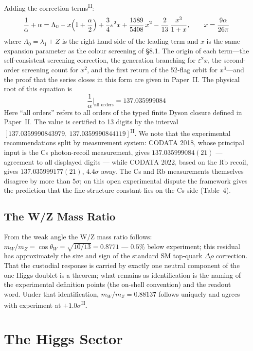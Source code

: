 \documentclass[12pt,a4paper]{article}
\newcommand{\PII}{\textsuperscript{\textup{II}}}
\begin{document}
Adding the correction terms\PII{}:
\[\frac{1}{\alpha} + \alpha = \Lambda_0 - x\Bigl(1+\frac{\alpha}{2}\Bigr) + \frac{3}{4}\varepsilon^2 x + \frac{1589}{5408}\,x^2 - \frac{2}{13}\,\frac{x^3}{1+x},\qquad x = \frac{9\alpha}{26\pi}\]
where $\Lambda_0 = \lambda_1 + Z$ is the right-hand side of the leading term and $x$ is the same expansion parameter as the colour screening of \S8.1. The origin of each term---the self-consistent screening correction, the generation branching for $\varepsilon^2 x$, the second-order screening count for $x^2$, and the first return of the 52-flag orbit for $x^3$---and the proof that the series closes in this form are given in Paper~II. The physical root of this equation is
\[\frac{1}{\alpha}\Big|_{\text{all orders}} = 137.035999084\]
Here ``all orders'' refers to all orders of the typed finite Dyson closure defined in Paper~II. The value is certified to 13 digits by the interval $[137.0359990843979,\ 137.0359990844119]$\PII{}. We note that the experimental recommendations split by measurement system: CODATA 2018, whose principal input is the Cs photon-recoil measurement, gives $137.035999084(21)$ --- agreement to all displayed digits --- while CODATA 2022, based on the Rb recoil, gives $137.035999177(21)$, $4.4\sigma$ away. The Cs and Rb measurements themselves disagree by more than $5\sigma$; on this open experimental dispute the framework gives the prediction that the fine-structure constant lies on the Cs side (Table~4).

\subsection{The W/Z Mass Ratio}

From the weak angle the W/Z mass ratio follows: $m_W/m_Z = \cos\theta_W = \sqrt{10/13} = 0.8771$ --- $0.5\%$ below experiment; this residual has approximately the size and sign of the standard SM top-quark $\Delta\rho$ correction. That the custodial response is carried by exactly one neutral component of the one Higgs doublet is a theorem; what remains as identification is the naming of the experimental definition points (the on-shell convention) and the readout word. Under that identification, $m_W/m_Z = 0.88137$ follows uniquely and agrees with experiment at $+1.0\sigma$\PII{}.



\section{The Higgs Sector}\label{sec:higgs}
\end{document}
